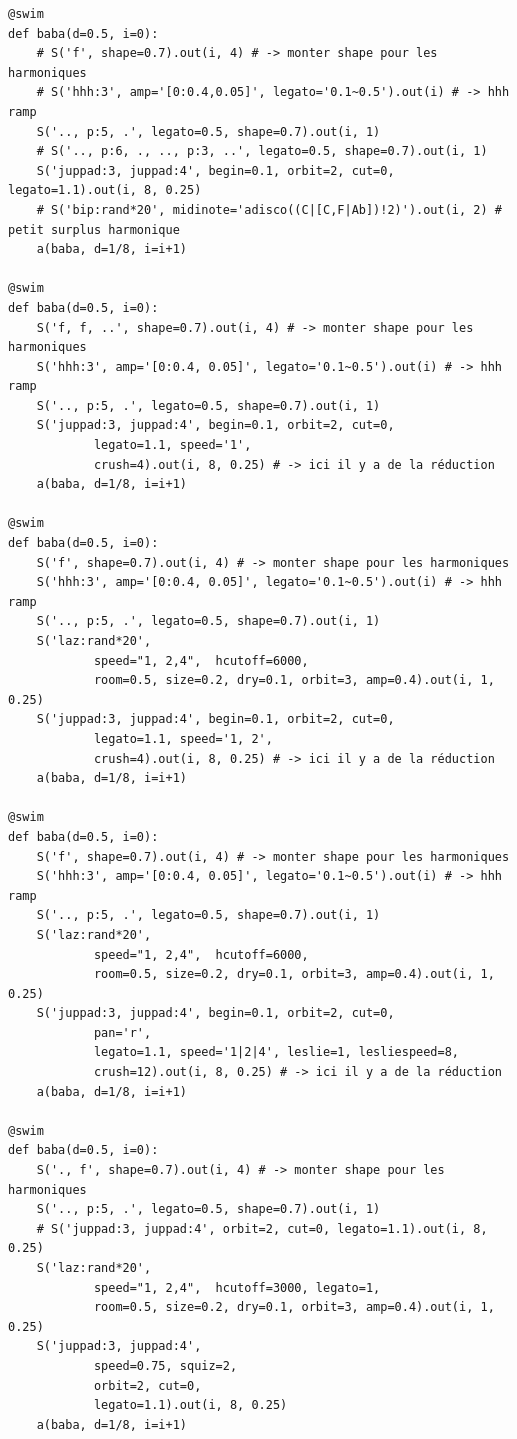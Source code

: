 \documentclass[11pt]{article}
\begin{document}
\begin{enumerate}
\begin{verbatim}
@swim
def baba(d=0.5, i=0):
    # S('f', shape=0.7).out(i, 4) # -> monter shape pour les harmoniques
    # S('hhh:3', amp='[0:0.4,0.05]', legato='0.1~0.5').out(i) # -> hhh ramp
    S('.., p:5, .', legato=0.5, shape=0.7).out(i, 1)
    # S('.., p:6, ., .., p:3, ..', legato=0.5, shape=0.7).out(i, 1)
    S('juppad:3, juppad:4', begin=0.1, orbit=2, cut=0, legato=1.1).out(i, 8, 0.25)
    # S('bip:rand*20', midinote='adisco((C|[C,F|Ab])!2)').out(i, 2) # petit surplus harmonique
    a(baba, d=1/8, i=i+1)

@swim
def baba(d=0.5, i=0):
    S('f, f, ..', shape=0.7).out(i, 4) # -> monter shape pour les harmoniques
    S('hhh:3', amp='[0:0.4, 0.05]', legato='0.1~0.5').out(i) # -> hhh ramp
    S('.., p:5, .', legato=0.5, shape=0.7).out(i, 1)
    S('juppad:3, juppad:4', begin=0.1, orbit=2, cut=0,
            legato=1.1, speed='1',
            crush=4).out(i, 8, 0.25) # -> ici il y a de la réduction
    a(baba, d=1/8, i=i+1)

@swim
def baba(d=0.5, i=0):
    S('f', shape=0.7).out(i, 4) # -> monter shape pour les harmoniques
    S('hhh:3', amp='[0:0.4, 0.05]', legato='0.1~0.5').out(i) # -> hhh ramp
    S('.., p:5, .', legato=0.5, shape=0.7).out(i, 1)
    S('laz:rand*20',
            speed="1, 2,4",  hcutoff=6000,
            room=0.5, size=0.2, dry=0.1, orbit=3, amp=0.4).out(i, 1, 0.25)
    S('juppad:3, juppad:4', begin=0.1, orbit=2, cut=0,
            legato=1.1, speed='1, 2',
            crush=4).out(i, 8, 0.25) # -> ici il y a de la réduction
    a(baba, d=1/8, i=i+1)

@swim
def baba(d=0.5, i=0):
    S('f', shape=0.7).out(i, 4) # -> monter shape pour les harmoniques
    S('hhh:3', amp='[0:0.4, 0.05]', legato='0.1~0.5').out(i) # -> hhh ramp
    S('.., p:5, .', legato=0.5, shape=0.7).out(i, 1)
    S('laz:rand*20',
            speed="1, 2,4",  hcutoff=6000,
            room=0.5, size=0.2, dry=0.1, orbit=3, amp=0.4).out(i, 1, 0.25)
    S('juppad:3, juppad:4', begin=0.1, orbit=2, cut=0,
            pan='r',
            legato=1.1, speed='1|2|4', leslie=1, lesliespeed=8,
            crush=12).out(i, 8, 0.25) # -> ici il y a de la réduction
    a(baba, d=1/8, i=i+1)

@swim
def baba(d=0.5, i=0):
    S('., f', shape=0.7).out(i, 4) # -> monter shape pour les harmoniques
    S('.., p:5, .', legato=0.5, shape=0.7).out(i, 1)
    # S('juppad:3, juppad:4', orbit=2, cut=0, legato=1.1).out(i, 8, 0.25)
    S('laz:rand*20',
            speed="1, 2,4",  hcutoff=3000, legato=1,
            room=0.5, size=0.2, dry=0.1, orbit=3, amp=0.4).out(i, 1, 0.25)
    S('juppad:3, juppad:4',
            speed=0.75, squiz=2,
            orbit=2, cut=0,
            legato=1.1).out(i, 8, 0.25)
    a(baba, d=1/8, i=i+1)


\end{verbatim}
\end{enumerate}
\end{document}
